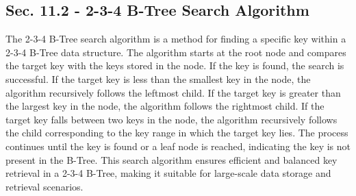 \subsection*{Sec. 11.2 - 2-3-4 B-Tree Search Algorithm}

The 2-3-4 B-Tree search algorithm is a method for finding a specific key within a 2-3-4 B-Tree data structure. The algorithm starts at the root node and compares the target key with the keys stored in the node. If the key is found, the search is successful. If the target key is less than the smallest key in the node, the algorithm recursively 
follows the leftmost child. If the target key is greater than the largest key in the node, the algorithm follows the rightmost child. If the target key falls between two keys in the node, the algorithm recursively follows the child corresponding to the key range in which the target key lies. The process continues until the key is found or a leaf node 
is reached, indicating the key is not present in the B-Tree. This search algorithm ensures efficient and balanced key retrieval in a 2-3-4 B-Tree, making it suitable for large-scale data storage and retrieval scenarios.

